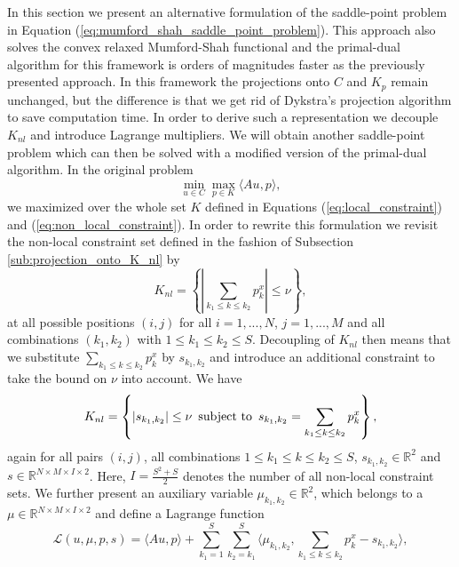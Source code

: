 \documentclass[abstracton]{scrreprt}
\begin{document}
        In this section we present an alternative formulation of the saddle-point problem in Equation (\ref{eq:mumford_shah_saddle_point_problem}). This approach also solves the convex relaxed Mumford-Shah functional and the primal-dual algorithm for this framework is orders of magnitudes faster as the previously presented approach. In this framework the projections onto $C$ and $K_{p}$ remain unchanged, but the difference is that we get rid of Dykstra's projection algorithm to save computation time. In order to derive such a representation we decouple $K_{nl}$ and introduce Lagrange multipliers. We will obtain another saddle-point problem which can then be solved with a modified version of the primal-dual algorithm. In the original problem
            \begin{equation}
                \min_{u \in C} \max_{p \in K} \langle Au, p \rangle,
                \label{eq:original_saddle_point_problem}
            \end{equation}
        we maximized over the whole set $K$ defined in Equations (\ref{eq:local_constraint}) and (\ref{eq:non_local_constraint}). In order to rewrite this formulation we revisit the non-local constraint set defined in the fashion of Subsection \ref{sub:projection_onto_K_nl} by
            $$
                K_{nl} = \left\{ \left| \sum_{k_{1} \le k \le k_{2}} p^{x}_{k} \right| \le \nu \right\},
            $$
        at all possible positions $(i,j)$ for all $i = 1, ..., N$, $j = 1, ..., M$ and all combinations $(k_{1}, k_{2})$ with $1 \le k_{1} \le k_{2} \le S$. Decoupling of $K_{nl}$ then means that we substitute $\sum_{k_{1} \le k \le k_{2}} p^{x}_{k}$ by $s_{k_{1}, k_{2}}$ and introduce an additional constraint to take the bound on $\nu$ into account. We have
            \begin{equation}
                K_{nl} = \left\{ |s_{k_{1}, k_{2}}| \le \nu \,\,\, \textnormal{subject to} \,\,\, s_{k_{1}, k_{2}} = \sum_{k_{1} \le k \le k_{2}} p^{x}_{k} \right\},
                \label{eq:non_local_constraint_reloaded}
            \end{equation}
        again for all pairs $(i,j)$, all combinations $1 \le k_{1} \le k \le k_{2} \le S$, $s_{k_{1}, k_{2}} \in \mathbb{R}^{2}$ and $s \in \mathbb{R}^{N \times M \times I \times 2}$. Here, $I = \frac{S^{2} + S}{2}$ denotes the number of all non-local constraint sets. We further present an auxiliary variable $\mu_{k_{1}, k_{2}} \in \mathbb{R}^{2}$, which belongs to a $\mu \in \mathbb{R}^{N \times M \times I \times 2}$ and define a Lagrange function
            \begin{equation}
                \mathcal{L}(u, \mu, p, s) = \langle Au, p \rangle + \sum_{k_{1} = 1}^{S} \sum_{k_{2} = k_{1}}^{S} \langle \mu_{k_{1}, k_{2}}, \sum_{k_{1} \le k \le k_{2}} p^{x}_{k} - s_{k_{1}, k_{2}} \rangle,
                \label{eq:lagrangian}
            \end{equation}
\end{document}
